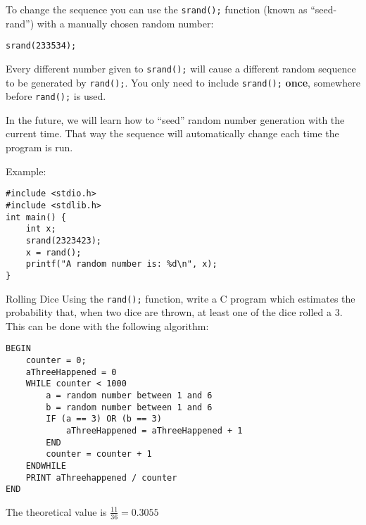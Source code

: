 \documentclass{lab}
\begin{document}
To change the sequence you can use the \texttt{srand();} function (known as ``seed-rand'') with a manually chosen random number:

\begin{lstlisting}[style=CStyle]
srand(233534);
\end{lstlisting}

Every different number given to \texttt{srand();} will cause a different random sequence to be generated by \texttt{rand();}. You only need to include \texttt{srand();} \textbf{once}, somewhere before \texttt{rand();} is used.

In the future, we will learn how to ``seed'' random number generation with the current time. That way the sequence will automatically change each time the program is run.

Example:

\begin{lstlisting}[style=CStyle]
#include <stdio.h>
#include <stdlib.h>
int main() {
	int x;
	srand(2323423);
	x = rand();
	printf("A random number is: %d\n", x);
}

\end{lstlisting}

\begin{task}{Rolling Dice}{}
Using the \texttt{rand();} function, write a C program which estimates the probability that, when two dice are thrown, at least one of the dice rolled a 3. This can be done with the following algorithm:
\begin{lstlisting}[style=pseudo]
BEGIN
	counter = 0;
	aThreeHappened = 0
	WHILE counter < 1000
		a = random number between 1 and 6
		b = random number between 1 and 6
		IF (a == 3) OR (b == 3)
			aThreeHappened = aThreeHappened + 1
		END
		counter = counter + 1
	ENDWHILE
	PRINT aThreehappened / counter
END
\end{lstlisting}

The theoretical value is $\frac{11}{36} = 0.3055$
\end{task}
\end{document}
